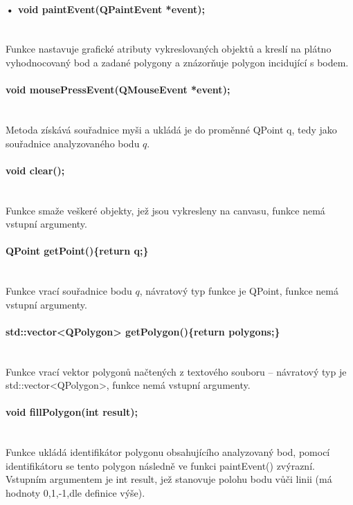 \documentclass[11pt]{article}
\begin{document}
\paragraph{•	void paintEvent(QPaintEvent *event);}\mbox{}\\
Funkce nastavuje grafické atributy vykreslovaných objektů a kreslí na plátno vyhodnocovaný bod a zadané polygony a znázorňuje polygon incidující s bodem. 

\paragraph{void mousePressEvent(QMouseEvent *event);}\mbox{}\\
Metoda získává souřadnice myši a ukládá je do proměnné QPoint q, tedy jako souřadnice analyzovaného bodu $q$.

\paragraph{void clear();}\mbox{}\\
Funkce smaže veškeré objekty, jež jsou vykresleny na canvasu, funkce nemá vstupní argumenty. 

\paragraph{QPoint getPoint()\{return q;\}}\mbox{}\\
Funkce vrací souřadnice bodu $q$, návratový typ funkce je QPoint, funkce nemá vstupní argumenty.

\paragraph{std::vector<QPolygon> getPolygon()\{return polygons;\}}\mbox{}\\
Funkce vrací vektor polygonů načtených z textového souboru – návratový typ je std::vector<QPolygon>, funkce nemá vstupní argumenty.

\paragraph{void fillPolygon(int result);}\mbox{}\\
Funkce ukládá identifikátor polygonu obsahujícího analyzovaný bod, pomocí identifikátoru se tento polygon následně ve funkci paintEvent() zvýrazní. Vstupním argumentem je int result, jež stanovuje polohu bodu vůči linii (má hodnoty 0,1,-1,dle definice výše). 
\end{document}
